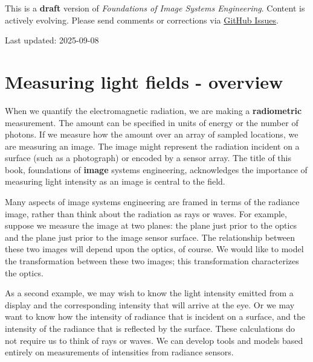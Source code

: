 \documentclass[
  letterpaper,
]{book}
\begin{document}
\begin{tcolorbox}[enhanced jigsaw, colframe=quarto-callout-warning-color-frame, titlerule=0mm, rightrule=.15mm, opacitybacktitle=0.6, colback=white, leftrule=.75mm, coltitle=black, title=\textcolor{quarto-callout-warning-color}{\faExclamationTriangle}\hspace{0.5em}{Work in Progress}, bottomrule=.15mm, colbacktitle=quarto-callout-warning-color!10!white, breakable, left=2mm, bottomtitle=1mm, toptitle=1mm, opacityback=0, arc=.35mm, toprule=.15mm]

This is a \textbf{draft} version of \emph{Foundations of Image Systems
Engineering}. Content is actively evolving. Please send comments or
corrections via \href{https://github.com/wandell/FISE-git/issues}{GitHub
Issues}.

Last updated: 2025-09-08

\end{tcolorbox}

\section{Measuring light fields -
overview}\label{sec-lfmeasurement-overview}

When we quantify the electromagnetic radiation, we are making a
\textbf{radiometric} measurement. The amount can be specified in units
of energy or the number of photons. If we measure how the amount over an
array of sampled locations, we are measuring an image. The image might
represent the radiation incident on a surface (such as a photograph) or
encoded by a sensor array. The title of this book, foundations of
\textbf{image} systems engineering, acknowledges the importance of
measuring light intensity as an image is central to the field.

Many aspects of image systems engineering are framed in terms of the
radiance image, rather than think about the radiation as rays or waves.
For example, suppose we measure the image at two planes: the plane just
prior to the optics and the plane just prior to the image sensor
surface. The relationship between these two images will depend upon the
optics, of course. We would like to model the transformation between
these two images; this transformation characterizes the optics.

As a second example, we may wish to know the light intensity emitted
from a display and the corresponding intensity that will arrive at the
eye. Or we may want to know how the intensity of radiance that is
incident on a surface, and the intensity of the radiance that is
reflected by the surface. These calculations do not require us to think
of rays or waves. We can develop tools and models based entirely on
measurements of intensities from radiance sensors.
\end{document}
